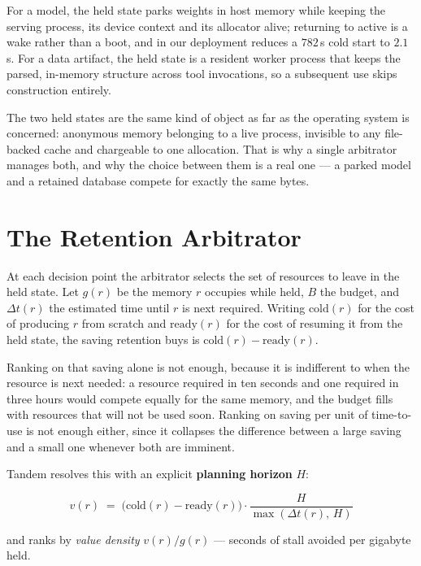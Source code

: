\documentclass[10pt,twocolumn]{article}
\newcommand{\sysname}{Tandem\xspace}   %
\begin{document}
For a model, the held state parks weights in host memory while keeping the
serving process, its device context and its allocator alive; returning to
active is a wake rather than a boot, and in our deployment reduces a
$782$\,s cold start to $2.1$\,s. For a data artifact, the held state is a
resident worker process that keeps the parsed, in-memory structure across
tool invocations, so a subsequent use skips construction entirely.

The two held states are the same kind of object as far as the operating
system is concerned: anonymous memory belonging to a live process, invisible
to any file-backed cache and chargeable to one allocation. That is why a
single arbitrator manages both, and why the choice between them is a real
one --- a parked model and a retained database compete for exactly the same
bytes.

\section{The Retention Arbitrator}

At each decision point the arbitrator selects the set of resources to leave
in the held state. Let $g(r)$ be the memory $r$ occupies while held, $B$ the
budget, and $\Delta t(r)$ the estimated time until $r$ is next required.
Writing $\mathrm{cold}(r)$ for the cost of producing $r$ from scratch and
$\mathrm{ready}(r)$ for the cost of resuming it from the held state, the
saving retention buys is $\mathrm{cold}(r) - \mathrm{ready}(r)$.

Ranking on that saving alone is not enough, because it is indifferent to
when the resource is next needed: a resource required in ten seconds and one
required in three hours would compete equally for the same memory, and the
budget fills with resources that will not be used soon. Ranking on saving per
unit of time-to-use is not enough either, since it collapses the difference
between a large saving and a small one whenever both are imminent.

\sysname resolves this with an explicit \textbf{planning horizon} $H$:

\begin{equation}
v(r) \;=\; \bigl(\mathrm{cold}(r) - \mathrm{ready}(r)\bigr)
           \cdot \frac{H}{\max\!\left(\Delta t(r),\, H\right)}
\label{eq:value}
\end{equation}

\noindent and ranks by \emph{value density} $v(r)/g(r)$ --- seconds of stall
avoided per gigabyte held.
\end{document}
